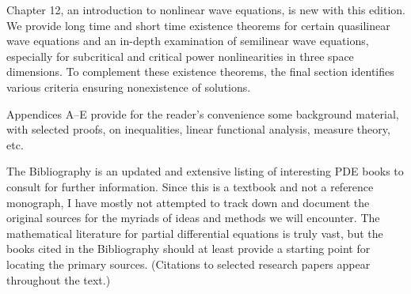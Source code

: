 Chapter 12, an introduction to nonlinear wave equations, is new with this edition. We provide long time and short time existence theorems for certain quasilinear wave equations and an in-depth examination of semilinear wave equations, especially for subcritical and critical power nonlinearities in three space dimensions. To complement these existence theorems, the final section identifies various criteria ensuring nonexistence of solutions.

Appendices A--E provide for the reader's convenience some background material, with selected proofs, on inequalities, linear functional analysis, measure theory, etc.

The Bibliography is an updated and extensive listing of interesting PDE books to consult for further information. Since this is a textbook and not a reference monograph, I have mostly not attempted to track down and document the original sources for the myriads of ideas and methods we will encounter. The mathematical literature for partial differential equations is truly vast, but the books cited in the Bibliography should at least provide a starting point for locating the primary sources. (Citations to selected research papers appear throughout the text.)
